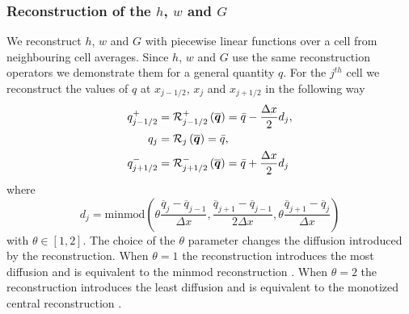 \subsubsection{Reconstruction of the $h$, $w$ and $G$}
We reconstruct $h$, $w$ and $G$ with piecewise linear functions over a cell from neighbouring cell averages. Since $h$, $w$ and $G$ use the same reconstruction operators we demonstrate them for a general quantity $q$. For the $j^{th}$ cell we reconstruct the values of $q$ at $x_{j-1/2} $, $x_{j} $ and $x_{j+1/2}$ in the following way
\begin{subequations}
	\begin{align}
	q^+_{j-1/2} & = \mathcal{R}^+_{j-1/2} \left(\overline{\boldsymbol{q}}\right) = \bar{q} - \dfrac{\Delta x}{2} d_j, \\
	q_{j} &= \mathcal{R}_{j} \left(\overline{\boldsymbol{q}}\right) =\bar{q} ,\\
	q^-_{j+1/2} &= \mathcal{R}^-_{j+1/2} \left(\overline{\boldsymbol{q}}\right) = \bar{q} + \dfrac{\Delta x}{2} d_j
	\end{align}
	\label{eqn:ReconforhwG}
\end{subequations}
where 
\begin{equation}
d_j = \text{minmod}\left(\theta \dfrac{\overline{q}_j -\overline{q}_{j-1} }{\Delta x}, \dfrac{\overline{q}_{j+1} -\overline{q}_{j-1} }{2\Delta x}, \theta\dfrac{\overline{q}_{j+1} -\overline{q}_{j} }{\Delta x}\right)
\label{eqn:slopehGrecon}
\end{equation}
with $\theta \in \left[1,2\right]$. The choice of the $\theta$ parameter changes the diffusion introduced by the reconstruction. When $\theta =1$ the reconstruction introduces the most diffusion and is equivalent to the minmod reconstruction \cite{Roe-1986-337}. When $\theta = 2$ the reconstruction introduces the least diffusion and is equivalent to the monotized central reconstruction \cite{VanLeer-1977-276}.

